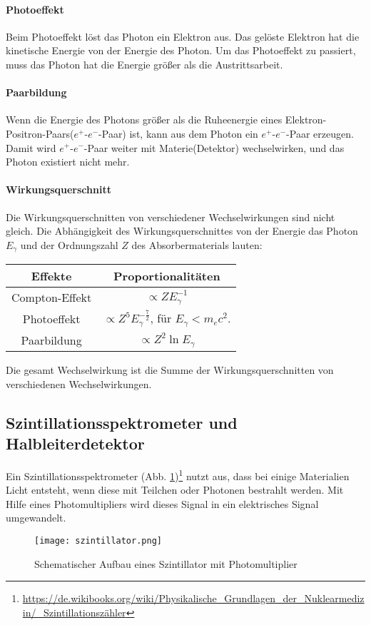 \documentclass[ngerman,11pt]{article}
\begin{document}
\begin{multicols}{2}
		\paragraph{Photoeffekt}
		Beim Photoeffekt l\"ost das Photon ein Elektron aus. Das gel\"oste Elektron hat die kinetische Energie von der Energie des Photon. Um das Photoeffekt zu passiert, muss das Photon hat die Energie gr\"o\ss er als die Austrittsarbeit.
		\paragraph{Paarbildung}
		Wenn die Energie des Photons gr\"o\ss er als die Ruheenergie eines Elektron-Positron-Paars($e^+$-$e^-$-Paar) ist, kann aus dem Photon ein $e^+$-$e^-$-Paar erzeugen. Damit wird $e^+$-$e^-$-Paar weiter mit Materie(Detektor) wechselwirken, und das Photon existiert nicht mehr.
		\paragraph{Wirkungsquerschnitt}
		Die Wirkungsquerschnitten von verschiedener Wechselwirkungen sind nicht gleich. Die Abh\"angigkeit des Wirkungsquerschnittes von der Energie das Photon $E_{\gamma}$ und der Ordnungszahl $Z$ des Absorbermaterials lauten:
		\begin{center}
			\centering
			\begin{tabular}{|c|c|}
				\hline 
				Effekte & Proportionalit\"aten \\ 
				\hline 
				Compton-Effekt & $\propto ZE_\gamma^{-1}$ \\ 
				\hline 
				Photoeffekt & $\propto Z^5E_\gamma^{-\frac{7}{2}}$, für $ E_\gamma<m_ec^2$.\protect \footnotemark[1]\\ 
				\hline 
				Paarbildung & $\propto Z^2\ln{E_\gamma}$ \\ 
				\hline 
			\end{tabular} 
		\end{center} 
		Die gesamt Wechselwirkung ist die Summe der Wirkungsquerschnitten von verschiedenen Wechselwirkungen. 
		\subsection{Szintillationsspektrometer und Halbleiterdetektor}
		Ein Szintillationsspektrometer (Abb. \ref{szintillator})\footnote[2]{\url{https://de.wikibooks.org/wiki/Physikalische_Grundlagen_der_Nuklearmedizin/_Szintillationszähler}} nutzt aus, dass bei einige Materialien Licht entsteht, wenn diese mit Teilchen oder Photonen bestrahlt werden. Mit Hilfe eines Photomultipliers wird dieses Signal in ein elektrisches Signal umgewandelt.
		\begin{figure}[H]
			\centering
			\texttt{[image: szintillator.png]}
			\caption{Schematischer Aufbau eines Szintillator mit Photomultiplier}
			\label{szintillator}
		\end{figure}

\end{multicols}
\end{document}
